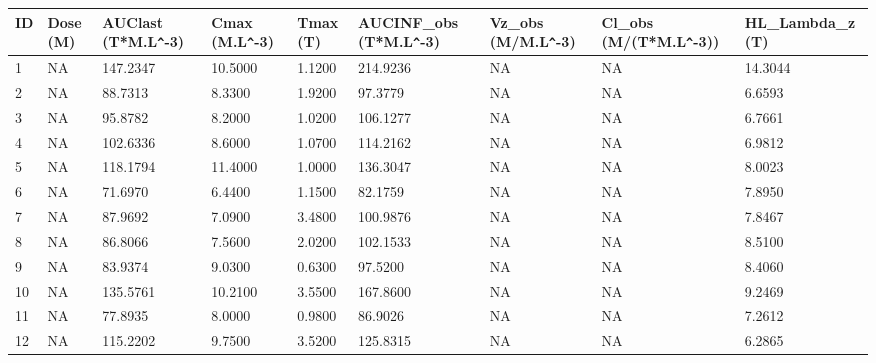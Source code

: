 \begingroup\tiny
\begin{longtable}{p{0.5cm}p{1.5cm}p{1.5cm}p{1.5cm}p{1.5cm}p{1.5cm}p{1.5cm}p{1.5cm}p{1.5cm}}
  \hline
ID & Dose (M) & AUClast (T*M.L\verb|^|-3) & Cmax (M.L\verb|^|-3) & Tmax (T) & AUCINF\_obs (T*M.L\verb|^|-3) & Vz\_obs (M/M.L\verb|^|-3) & Cl\_obs (M/(T*M.L\verb|^|-3)) & HL\_Lambda\_z (T) \\ 
  \hline
1 & NA & 147.2347 & 10.5000 & 1.1200 & 214.9236 & NA & NA & 14.3044 \\ 
  2 & NA &  88.7313 &  8.3300 & 1.9200 &  97.3779 & NA & NA &  6.6593 \\ 
  3 & NA &  95.8782 &  8.2000 & 1.0200 & 106.1277 & NA & NA &  6.7661 \\ 
  4 & NA & 102.6336 &  8.6000 & 1.0700 & 114.2162 & NA & NA &  6.9812 \\ 
  5 & NA & 118.1794 & 11.4000 & 1.0000 & 136.3047 & NA & NA &  8.0023 \\ 
  6 & NA &  71.6970 &  6.4400 & 1.1500 &  82.1759 & NA & NA &  7.8950 \\ 
  7 & NA &  87.9692 &  7.0900 & 3.4800 & 100.9876 & NA & NA &  7.8467 \\ 
  8 & NA &  86.8066 &  7.5600 & 2.0200 & 102.1533 & NA & NA &  8.5100 \\ 
  9 & NA &  83.9374 &  9.0300 & 0.6300 &  97.5200 & NA & NA &  8.4060 \\ 
  10 & NA & 135.5761 & 10.2100 & 3.5500 & 167.8600 & NA & NA &  9.2469 \\ 
  11 & NA &  77.8935 &  8.0000 & 0.9800 &  86.9026 & NA & NA &  7.2612 \\ 
  12 & NA & 115.2202 &  9.7500 & 3.5200 & 125.8315 & NA & NA &  6.2865 \\ 
   \hline
\hline
\end{longtable}
\endgroup
